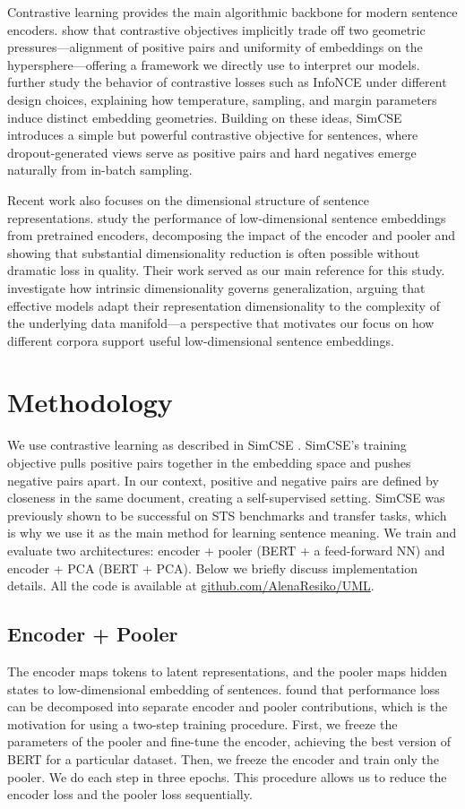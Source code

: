 \documentclass{article}
\begin{document}
Contrastive learning provides the main algorithmic backbone for modern sentence encoders.
\cite{wang2020contrastive} show that contrastive objectives implicitly trade off two geometric
pressures—alignment of positive pairs and uniformity of embeddings on the hypersphere—offering a framework we
directly use to interpret our models. \cite{wang2021divergence} further study the behavior of
contrastive losses such as InfoNCE under different design choices, explaining how temperature, sampling, and
margin parameters induce distinct embedding geometries. Building on these ideas, SimCSE \cite{gao2021simcse}
introduces a simple but powerful contrastive objective for sentences, where dropout-generated views serve as
positive pairs and hard negatives emerge naturally from in-batch sampling.

Recent work also focuses on the dimensional structure of sentence representations.
\cite{wang2023} study the performance of low-dimensional sentence embeddings from pretrained encoders,
decomposing the impact of the encoder and pooler and showing that substantial dimensionality reduction is
often possible without dramatic loss in quality. Their work served as our main reference for this study.
\cite{amit2021intrinsicdim} investigate how
intrinsic dimensionality governs generalization, arguing that effective models adapt their representation
dimensionality to the complexity of the underlying data manifold—a perspective that motivates our focus on
how different corpora support useful low-dimensional sentence embeddings.
\section{Methodology}
We use contrastive learning as described in SimCSE \cite{gao2021simcse}. SimCSE's training objective pulls
positive pairs together in the embedding space and pushes negative pairs apart. In our context, positive and
negative pairs are defined by closeness in the same document, creating a self-supervised setting. SimCSE was
previously shown to be successful on STS benchmarks and transfer tasks, which is why we use it as the main
method for learning sentence meaning. We train and evaluate two architectures: encoder + pooler (BERT + a
feed-forward NN) and encoder + PCA (BERT + PCA). Below we briefly discuss implementation details. All the
code is available at \href{https://github.com/AlenaResiko/UML}{github.com/AlenaResiko/UML}.

\subsection{Encoder + Pooler}
The encoder maps tokens to latent representations, and the pooler maps hidden states to
low-dimensional embedding of sentences. \cite{wang2023} found that performance loss can be decomposed into
separate encoder and pooler contributions, which is the motivation for using a two-step training procedure.
First, we freeze the parameters of the pooler and fine-tune the encoder, achieving the best version of BERT
for a particular dataset. Then, we freeze the encoder and train
only the pooler. We do each step in three epochs. This procedure allows us to reduce the encoder loss and the
pooler loss sequentially.
\end{document}
